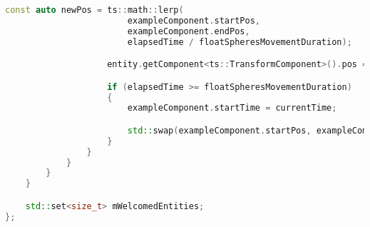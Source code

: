\begin{itemize}
\begin{lstlisting}[language=c++, caption=\texttt{ExampleSystem} class (./game/systems/example\_system.hpp)]
                    const auto newPos = ts::math::lerp(
                        exampleComponent.startPos,
                        exampleComponent.endPos,
                        elapsedTime / floatSpheresMovementDuration);

                    entity.getComponent<ts::TransformComponent>().pos = newPos;

                    if (elapsedTime >= floatSpheresMovementDuration)
                    {
                        exampleComponent.startTime = currentTime;

                        std::swap(exampleComponent.startPos, exampleComponent.endPos);
                    }
                }
            }
        }
    }

    std::set<size_t> mWelcomedEntities;
};
\end{lstlisting}
\end{itemize}